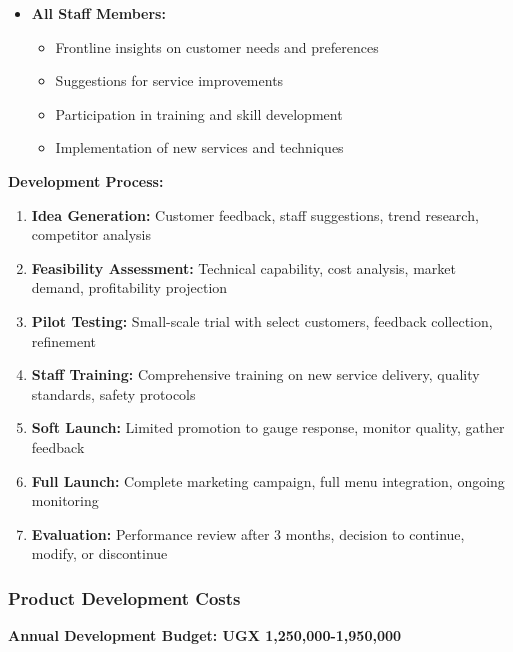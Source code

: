 \begin{itemize}[leftmargin=2em]
    \item \textbf{All Staff Members:}
    \begin{itemize}
        \item Frontline insights on customer needs and preferences
        \item Suggestions for service improvements
        \item Participation in training and skill development
        \item Implementation of new services and techniques
    \end{itemize}
\end{itemize}

\textbf{Development Process:}
\begin{enumerate}[leftmargin=2em]
    \item \textbf{Idea Generation:} Customer feedback, staff suggestions, trend research, competitor analysis
    \item \textbf{Feasibility Assessment:} Technical capability, cost analysis, market demand, profitability projection
    \item \textbf{Pilot Testing:} Small-scale trial with select customers, feedback collection, refinement
    \item \textbf{Staff Training:} Comprehensive training on new service delivery, quality standards, safety protocols
    \item \textbf{Soft Launch:} Limited promotion to gauge response, monitor quality, gather feedback
    \item \textbf{Full Launch:} Complete marketing campaign, full menu integration, ongoing monitoring
    \item \textbf{Evaluation:} Performance review after 3 months, decision to continue, modify, or discontinue
\end{enumerate}

\subsubsection{Product Development Costs}

\textbf{Annual Development Budget: UGX 1,250,000-1,950,000}

